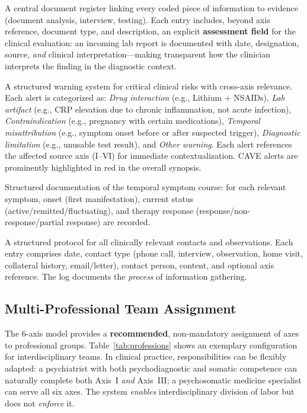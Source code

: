 \documentclass[11pt,a4paper]{article}
\begin{document}
\begin{description}[style=nextline, leftmargin=1.5cm, font=\bfseries]
\item[Evidence Matrix] A central document register linking every coded piece of information to evidence (document analysis, interview, testing). Each entry includes, beyond axis reference, document type, and description, an explicit \textbf{assessment field} for the clinical evaluation: an incoming lab report is documented with date, designation, source, \textit{and} clinical interpretation---making transparent how the clinician interprets the finding in the diagnostic context.
\item[CAVE Alerts] A structured warning system for critical clinical risks with cross-axis relevance. Each alert is categorized as: \textit{Drug interaction} (e.g., Lithium + NSAIDs), \textit{Lab artifact} (e.g., CRP elevation due to chronic inflammation, not acute infection), \textit{Contraindication} (e.g., pregnancy with certain medications), \textit{Temporal misattribution} (e.g., symptom onset before or after suspected trigger), \textit{Diagnostic limitation} (e.g., unusable test result), and \textit{Other warning}. Each alert references the affected source axis (I--VI) for immediate contextualization. CAVE alerts are prominently highlighted in red in the overall synopsis.
\item[Longitudinal Symptom Course] Structured documentation of the temporal symptom course: for each relevant symptom, onset (first manifestation), current status (active/remitted/fluctuating), and therapy response (response/non-response/partial response) are recorded.
\item[Contact and Observation Log] A structured protocol for all clinically relevant contacts and observations. Each entry comprises date, contact type (phone call, interview, observation, home visit, collateral history, email/letter), contact person, content, and optional axis reference. The log documents the \textit{process} of information gathering.
\end{description}

\subsection{Multi-Professional Team Assignment}
\label{sec:multiprofessional}

The 6-axis model provides a \textbf{recommended}, non-mandatory assignment of axes to professional groups. Table~\ref{tab:professions} shows an exemplary configuration for interdisciplinary teams. In clinical practice, responsibilities can be flexibly adapted: a psychiatrist with both psychodiagnostic and somatic competence can naturally complete both Axis~I \textit{and} Axis~III; a psychosomatic medicine specialist can serve all six axes. The system \textit{enables} interdisciplinary division of labor but does not \textit{enforce} it.
\end{document}
